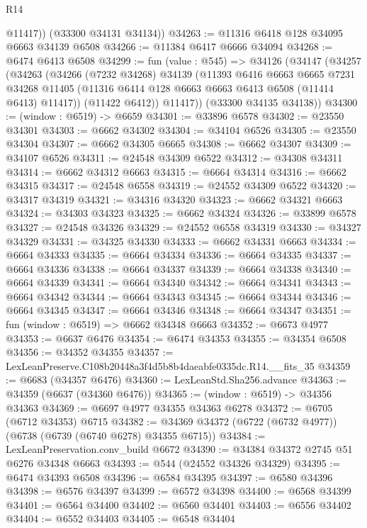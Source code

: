 \begin{lexlean}{R14}
\begin{coremodule}
          @11417))
      (@33300 @34131 @34134))
@34263 := @11316 @6418 @128 @34095 @6663 @34139 @6508
@34266 := @11384 @6417 @6666 @34094
@34268 := @6474 @6413 @6508
@34299 := fun (value : @545) =>
  @34126
    (@34147
      (@34257
        (@34263
          (@34266
            (@7232 @34268)
            @34139
            (@11393
              @6416
              @6663
              @6665
              @7231
              @34268
              @11405
              (@11316 @6414 @128 @6663 @6663 @6413 @6508 (@11414 @6413) @11417))
            (@11422 @6412))
          @11417))
      (@33300 @34135 @34138))
@34300 := (window : @6519) -> @6659
@34301 := @33896 @6578
@34302 := @23550 @34301
@34303 := @6662 @34302
@34304 := @34104 @6526
@34305 := @23550 @34304
@34307 := @6662 @34305 @6665
@34308 := @6662 @34307
@34309 := @34107 @6526
@34311 := @24548 @34309 @6522
@34312 := @34308 @34311
@34314 := @6662 @34312 @6663
@34315 := @6664 @34314
@34316 := @6662 @34315
@34317 := @24548 @6558
@34319 := @24552 @34309 @6522
@34320 := @34317 @34319
@34321 := @34316 @34320
@34323 := @6662 @34321 @6663
@34324 := @34303 @34323
@34325 := @6662 @34324
@34326 := @33899 @6578
@34327 := @24548 @34326
@34329 := @24552 @6558 @34319
@34330 := @34327 @34329
@34331 := @34325 @34330
@34333 := @6662 @34331 @6663
@34334 := @6664 @34333
@34335 := @6664 @34334
@34336 := @6664 @34335
@34337 := @6664 @34336
@34338 := @6664 @34337
@34339 := @6664 @34338
@34340 := @6664 @34339
@34341 := @6664 @34340
@34342 := @6664 @34341
@34343 := @6664 @34342
@34344 := @6664 @34343
@34345 := @6664 @34344
@34346 := @6664 @34345
@34347 := @6664 @34346
@34348 := @6664 @34347
@34351 := fun (window : @6519) => @6662 @34348 @6663
@34352 := @6673 @4977
@34353 := @6637 @6476
@34354 := @6474 @34353
@34355 := @34354 @6508
@34356 := @34352 @34355
@34357 := LexLeanPreserve.C108b20448a3f4d5b8b4daeabfe0335dc.R14.__fits_35
@34359 := @6683 (@34357 @6476)
@34360 := LexLeanStd.Sha256.advance
@34363 := @34359 (@6637 (@34360 @6476))
@34365 := (window : @6519) -> @34356 @34363
@34369 := @6697 @4977 @34355 @34363 @6278
@34372 := @6705 (@6712 @34353) @6715
@34382 := @34369 @34372 (@6722 (@6732 @4977)) (@6738 (@6739 (@6740 @6278) @34355 @6715))
@34384 := LexLeanPreservation.conv_build @6672
@34390 := @34384 @34372 @2745 @51 @6276 @34348 @6663
@34393 := @544 (@24552 @34326 @34329)
@34395 := @6474 @34393 @6508
@34396 := @6584 @34395
@34397 := @6580 @34396
@34398 := @6576 @34397
@34399 := @6572 @34398
@34400 := @6568 @34399
@34401 := @6564 @34400
@34402 := @6560 @34401
@34403 := @6556 @34402
@34404 := @6552 @34403
@34405 := @6548 @34404

\end{coremodule}
\end{lexlean}
